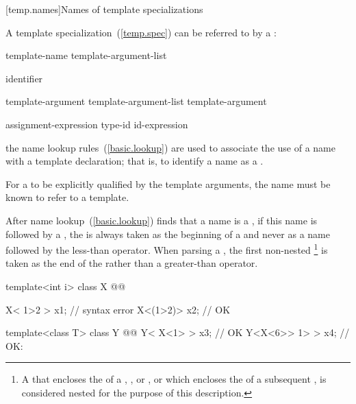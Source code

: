 [temp.names]{Names of template specializations}

\pnum
A template specialization~(\ref{temp.spec}) can be referred to by a
:

\begin{bnf}
\br
  template-name \terminal{<} template-argument-list\opt \terminal{>}
\end{bnf}

\begin{bnf}
\br
  identifier
\end{bnf}

\begin{bnf}
\br
  template-argument\br
  template-argument-list \terminal{,} template-argument
\end{bnf}

\begin{bnf}
\br
  assignment-expression\br
  type-id\br
  id-expression
\end{bnf}

\enternote
the name lookup rules~(\ref{basic.lookup}) are used to associate the use of
a name with a template declaration;
that is, to identify a name as a
.
\exitnote

\pnum
For a
to be explicitly qualified by the template arguments,
the name must be known to refer to a template.

\pnum
{}%
After name lookup~(\ref{basic.lookup}) finds that a name is a
,
if this name is followed by a
\tcode{<},
the
\tcode{<}
is always taken as the beginning of a
and never as a name followed by the less-than operator.
When parsing a ,
the first non-nested
\tcode{>}\footnote{A \tcode{>} that encloses the 
of a , , 
or , or which encloses the 
of a subsequent , is considered nested for the purpose
of this description.
}
is taken as the end of the 
rather than a greater-than operator.
\enterexample

\begin{codeblock}
template<int i> class X @@

X< 1>2 >	x1;             // syntax error
X<(1>2)>	x2;             // OK

template<class T> class Y @@
Y< X<1> >	x3;             // OK
Y<X<6>> 1> >	x4;             // OK: 
\end{codeblock}
\exitexampleb

